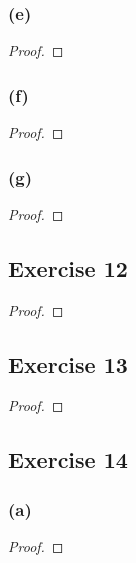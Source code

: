 \documentclass[14pt]{extarticle}
\begin{document}
\subsubsection{(e)}

\begin{proof}

\end{proof}

\subsubsection{(f)}

\begin{proof}

\end{proof}

\subsubsection{(g)}

\begin{proof}

\end{proof}

\subsection{Exercise 12}

\begin{proof}

\end{proof}

\subsection{Exercise 13}

\begin{proof}

\end{proof}

\subsection{Exercise 14}

\subsubsection{(a)}

\begin{proof}

\end{proof}
\end{document}
